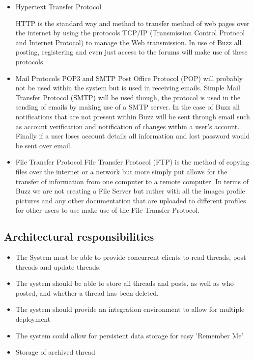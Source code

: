 \documentclass[10pt]{article}
\begin{document}
\begin{itemize}
\item Hypertext Transfer Protocol

HTTP is the standard way and method to transfer method of web pages over the internet by using the protocols TCP/IP (Transmission Control Protocol and Internet Protocol) to manage the Web transmission. In use of Buzz all posting, registering and even just access to the forums will make use of these protocols.

\item Mail Protocols POP3 and SMTP
Post Office Protocol (POP) will probably not be used within the system but is used in receiving emails. Simple Mail Transfer Protocol (SMTP) will be used though, the protocol is used in the sending of emails by making use of a SMTP server. In the case of Buzz all notifications that are not present within Buzz will be sent through email such as account verification and notification of changes within a user’s account. Finally if a user loses account details all information and lost password would be sent over email.

\item File Transfer Protocol
File Transfer Protocol (FTP) is the method of copying files over the internet or a network but more simply put allows for the transfer of information from one computer to a remote computer. In terms of Buzz we are not creating a File Server but rather with all the images profile pictures and any other documentation that are uploaded to different profiles for other users to use make use of the File Transfer Protocol.

\end{itemize}

\clearpage

\subsection{Architectural responsibilities}  %
\begin{itemize}
	\item The System must be able to provide concurrent clients to read threads, post threads and update threads.
	\item The system should be able to store all threads and posts, as well as who posted, and whether a thread has been deleted.
	\item The system should provide an integration environment to allow for multiple deployment
	\item The system could allow for persistent data storage for easy 'Remember Me'
	\item Storage of archived thread
	
\end{itemize}
\clearpage
\end{document}
